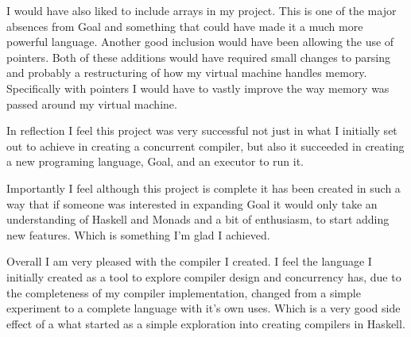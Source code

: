 I would have also liked to include arrays in my project. This is one of the major absences from Goal and something that could have made it a much more powerful language. Another good inclusion would have been allowing the use of pointers. Both of these additions would have required small changes to parsing and probably a restructuring of how my virtual machine handles memory. Specifically with pointers I would have to vastly improve the way memory was passed around my virtual machine.   
   
In reflection I feel this project was very successful not just in what I initially set out to achieve in creating a concurrent compiler, but also it succeeded in creating a new programing language, Goal, and an executor to run it. 

Importantly I feel although this project is complete it has been created in such a way that if someone was interested in expanding Goal it would only take an understanding of Haskell and Monads and a bit of enthusiasm, to start adding new features. Which is something I'm glad I achieved. 

Overall I am very pleased with the compiler I created. I feel the language I initially created as a tool to explore compiler design and concurrency has, due to the completeness of my compiler implementation, changed from a simple experiment to a complete language with it's own uses. Which is a very good side effect of a what started as a simple exploration into creating compilers in Haskell. 
